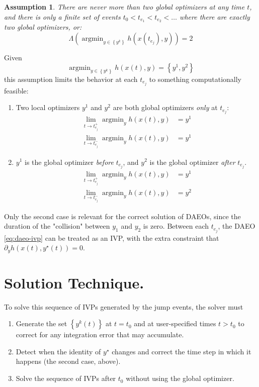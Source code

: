 \documentclass[twoside,leqno,twocolumn]{article}
\DeclareMathOperator*{\argmin}{\arg\min}
\newtheorem{assumption}{Assumption}[section]
\begin{document}
\begin{assumption}
	\label{assume:events-exist}
	There are never more than two global optimizers at any time $t$, and there is only a finite set of events $t_0 < t_{e_1} < t_{e_2} < \ldots$ where there are exactly two global optimizers, or:
	\begin{equation*}
		\Lambda\left(\argmin_{y\in\left\{y^k\right\}}h(x(t_{e_j}), y)\right) = 2
	\end{equation*}
\end{assumption}
Given 
\begin{equation*}
	\argmin_{y\in\left\{y^k\right\}} h(x(t), y) = \left\{y^1, y^2\right\}
\end{equation*}
this assumption limits the behavior at each $t_{e_j}$ to something computationally feasible: 
\begin{enumerate}
	\item Two local optimizers $y^1$ and $y^2$ are both global optimizers \textit{only} at $t_{e_j}$:
	\begin{equation*}
		\begin{aligned}
			\lim_{t\to t_{e_j}^+} \argmin_{y} h(x(t), y) &= y^1\\
			\lim_{t\to t_{e_j}^-} \argmin_{y} h(x(t), y) &= y^1
		\end{aligned}
	\end{equation*}
	\item $y^1$ is the global optimizer \textit{before} $t_{e_j}$, and $y^2$ is the global optimizer \textit{after} $t_{e_j}$.
	\begin{equation*}
		\begin{aligned}
			\lim_{t\to t_{e_j}^+} \argmin_{y} h(x(t), y) &= y^1\\
			\lim_{t\to t_{e_j}^-} \argmin_{y} h(x(t), y) &= y^2
		\end{aligned}
	\end{equation*}
\end{enumerate}
Only the second case is relevant for the correct solution of DAEOs, since the duration of the "collision" between $y_1$ and $y_2$ is zero. Between each $t_{e_j}$, the DAEO \eqref{eq:daeo-ivp} can be treated as an IVP, with the extra constraint that $\partial_{y} h(x(t), y^\star(t)) = 0$.

\section{Solution Technique.}
To solve this sequence of IVPs generated by the jump events, the solver must 
\begin{enumerate}
	\item Generate the set $\left\{y^k(t)\right\}$ at $t=t_0$ and at user-specified times $t>t_0$ to correct for any integration error that may accumulate.
	\item Detect when the identity of $y^\star$ changes and correct the time step in which it happens (the second case, above).
	\item Solve the sequence of IVPs after $t_0$ without using the global optimizer.
\end{enumerate}
\end{document}

